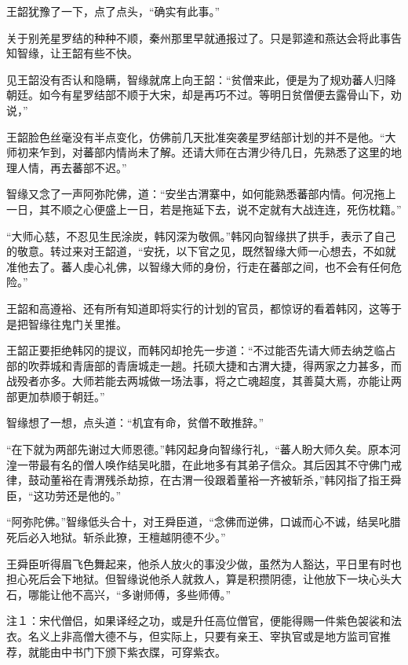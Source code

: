 王韶犹豫了一下，点了点头，“确实有此事。”

关于别羌星罗结的种种不顺，秦州那里早就通报过了。只是郭逵和燕达会将此事告知智缘，让王韶有些不快。

见王韶没有否认和隐瞒，智缘就席上向王韶：“贫僧来此，便是为了规劝蕃人归降朝廷。如今有星罗结部不顺于大宋，却是再巧不过。等明日贫僧便去露骨山下，劝说，”

王韶脸色丝毫没有半点变化，仿佛前几天批准突袭星罗结部计划的并不是他。“大师初来乍到，对蕃部内情尚未了解。还请大师在古渭少待几日，先熟悉了这里的地理人情，再去蕃部不迟。”

智缘又念了一声阿弥陀佛，道：“安坐古渭寨中，如何能熟悉蕃部内情。何况拖上一日，其不顺之心便盛上一日，若是拖延下去，说不定就有大战连连，死伤枕籍。”

“大师心慈，不忍见生民涂炭，韩冈深为敬佩。”韩冈向智缘拱了拱手，表示了自己的敬意。转过来对王韶道，“安抚，以下官之见，既然智缘大师一心想去，不如就准他去了。蕃人虔心礼佛，以智缘大师的身份，行走在蕃部之间，也不会有任何危险。”

王韶和高遵裕、还有所有知道即将实行的计划的官员，都惊讶的看着韩冈，这等于是把智缘往鬼门关里推。

王韶正要拒绝韩冈的提议，而韩冈却抢先一步道：“不过能否先请大师去纳芝临占部的吹莽城和青唐部的青唐城走一趟。托硕大捷和古渭大捷，得两家之力甚多，而战殁者亦多。大师若能去两城做一场法事，将之亡魂超度，其善莫大焉，亦能让两部更加恭顺于朝廷。”

智缘想了一想，点头道：“机宜有命，贫僧不敢推辞。”

“在下就为两部先谢过大师恩德。”韩冈起身向智缘行礼，“蕃人盼大师久矣。原本河湟一带最有名的僧人唤作结吴叱腊，在此地多有其弟子信众。其后因其不守佛门戒律，鼓动董裕在青渭残杀劫掠，在古渭一役跟着董裕一齐被斩杀，”韩冈指了指王舜臣，“这功劳还是他的。”

“阿弥陀佛。”智缘低头合十，对王舜臣道，“念佛而逆佛，口诚而心不诚，结吴叱腊死后必入地狱。斩杀此獠，王檀越阴德不少。”

王舜臣听得眉飞色舞起来，他杀人放火的事没少做，虽然为人豁达，平日里有时也担心死后会下地狱。但智缘说他杀人就救人，算是积攒阴德，让他放下一块心头大石，哪能让他不高兴，“多谢师傅，多些师傅。”

注１：宋代僧侣，如果译经之功，或是升任高位僧官，便能得赐一件紫色袈裟和法衣。名义上非高僧大德不与，但实际上，只要有亲王、宰执官或是地方监司官推荐，就能由中书门下颁下紫衣牒，可穿紫衣。

